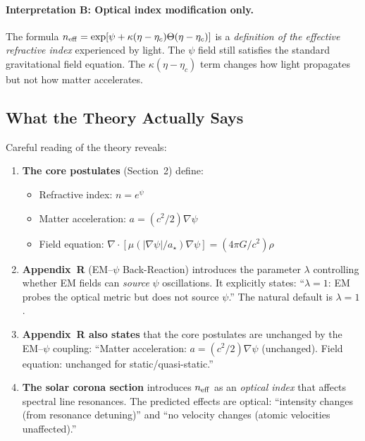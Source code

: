 \documentclass[12pt,a4paper]{article}
\theoremstyle{remark}
\begin{document}
\paragraph{Interpretation B: Optical index modification only.}
The formula $n_{\rm eff} = \exp[\psi + \kappa(\eta - \eta_c)\Theta(\eta - \eta_c)]$
is a \emph{definition of the effective refractive index} experienced by light.
The $\psi$ field still satisfies the standard gravitational field equation.
The $\kappa(\eta - \eta_c)$ term changes how light propagates but not how
matter accelerates.

\subsection{What the Theory Actually Says}

Careful reading of the theory reveals:

\begin{enumerate}
\item \textbf{The core postulates} (Section~2) define:
  \begin{itemize}
  \item Refractive index: $n = e^\psi$
  \item Matter acceleration: $a = (c^2/2)\nabla\psi$
  \item Field equation: $\nabla \cdot [\mu(|\nabla\psi|/a_\star)\nabla\psi]
    = (4\pi G/c^2)\rho$
  \end{itemize}

\item \textbf{Appendix~R} (EM--$\psi$ Back-Reaction) introduces the parameter
  $\lambda$ controlling whether EM fields can \emph{source} $\psi$ oscillations.
  It explicitly states: ``$\lambda = 1$: EM probes the optical metric but does
  not source $\psi$.'' The natural default is $\lambda = 1$.

\item \textbf{Appendix~R also states} that the core postulates are unchanged
  by the EM--$\psi$ coupling: ``Matter acceleration: $a = (c^2/2)\nabla\psi$
  (unchanged). Field equation: unchanged for static/quasi-static.''

\item \textbf{The solar corona section} introduces $n_{\rm eff}$ as an
  \emph{optical index} that affects spectral line resonances. The predicted
  effects are optical: ``intensity changes (from resonance detuning)'' and
  ``no velocity changes (atomic velocities unaffected).''
\end{enumerate}
\end{document}
